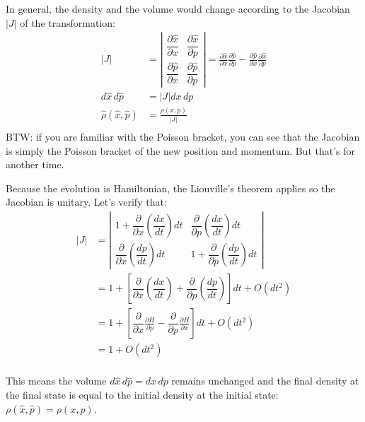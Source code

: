 \documentclass[aps,pra,10pt,floatfix,nofootinbib]{revtex4-1}
\theoremstyle{definition}
\begin{document}
In general, the density and the volume would change according to the Jacobian $|J|$ of the transformation:
\begin{equation}
\begin{aligned}
|J| &= \left| \begin{matrix}
\dfrac{\partial \hat{x}}{\partial x} & \dfrac{\partial \hat{x}}{\partial p} \\[2.2ex]
\dfrac{\partial \hat{p}}{\partial x} & \dfrac{\partial \hat{p}}{\partial p} \end{matrix} \right| = \frac{\partial \hat{x}}{\partial x} \frac{\partial \hat{p}}{\partial p} - \frac{\partial \hat{p}}{\partial x} \frac{\partial \hat{x}}{\partial p}\\
d\hat{x}\,d\hat{p} &= |J| dx \,dp  \\
\hat{\rho}(\hat{x}, \hat{p}) &= \frac{\rho(x, p)}{|J|}  \\
\end{aligned}
\label{newDistribution}
\end{equation}
BTW: if you are familiar with the Poisson bracket, you can see that the Jacobian is simply the Poisson bracket of the new position and momentum. But that's for another time.

Because the evolution is Hamiltonian, the Liouville's theorem applies so the Jacobian is unitary. Let's verify that:
\begin{equation}
\begin{aligned}
|J| &= \left| \begin{matrix}
1 + \dfrac{\partial}{\partial x} \left( \dfrac{dx}{dt} \right) dt & \dfrac{\partial}{\partial p} \left( \dfrac{dx}{dt} \right) dt \\[2.2ex]
\dfrac{\partial}{\partial x} \left( \dfrac{dp}{dt} \right) dt & 1 + \dfrac{\partial}{\partial p} \left( \dfrac{dp}{dt} \right) dt \end{matrix} \right| \\
&= 1 + \left[ \dfrac{\partial}{\partial x} \left( \dfrac{dx}{dt} \right) + \dfrac{\partial}{\partial p} \left( \dfrac{dp}{dt} \right) \right] dt + O(dt^2)\\
&= 1 + \left[ \dfrac{\partial}{\partial x} \frac{\partial H}{\partial p} - \dfrac{\partial}{\partial p} \frac{\partial H}{\partial x} \right] dt + O(dt^2)\\
&= 1 + O(dt^2)\\
\end{aligned}
\label{Jacobian}
\end{equation}

This means the volume $d\hat{x}\,d\hat{p} = dx \,dp$ remains unchanged and the final density at the final state is equal to the initial density at the initial state: $\rho(\hat{x}, \hat{p}) = \rho(x, p)$.  
\end{document}
